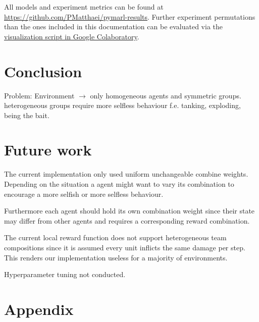 All models and experiment metrics can be found at \url{https://github.com/PMatthaei/pymarl-results}. Further experiment permutations than the ones included in this documentation can be evaluated via the \href{https://github.com/PMatthaei/pymarl-results/blob/master/visualize_pymarl.ipynb}{visualization script in Google Colaboratory}.


\chapter{Conclusion}
 Problem: Environment $\rightarrow$ only homogeneous agents and symmetric groups. heterogeneous groups require more selfless behaviour f.e. tanking, exploding, being the bait.
 
\chapter{Future work}
The current implementation only used uniform unchangeable combine weights. Depending on the situation a agent might want to vary its combination to encourage a more selfish or more selfless behaviour.

Furthermore each agent should hold its own combination weight since their state may differ from other agents and requires a corresponding reward combination.

The current local reward function does not support heterogeneous team compositions since it is assumed every unit inflicts the same damage per step. This renders our implementation useless for a majority of environments.

Hyperparameter tuning not conducted.

\appendix
\chapter{Appendix}
\newpage
